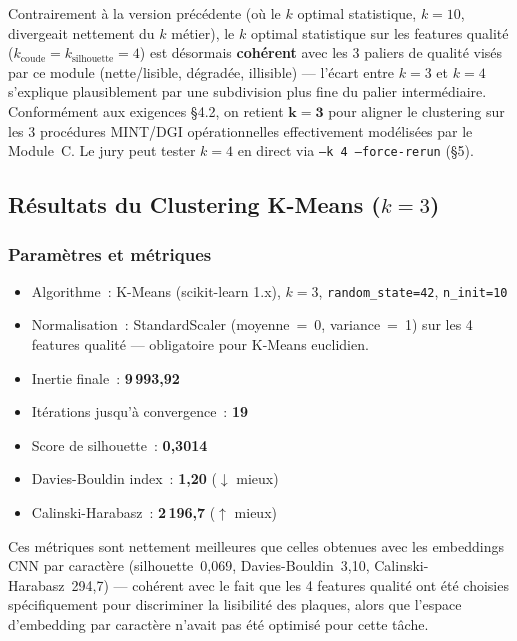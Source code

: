 Contrairement à la version précédente (où le $k$ optimal statistique,
$k=10$, divergeait nettement du $k$ métier), le $k$ optimal statistique
sur les features qualité ($k_{\text{coude}}=k_{\text{silhouette}}=4$)
est désormais \textbf{cohérent} avec les 3 paliers de qualité visés par
ce module (nette/lisible, dégradée, illisible) — l'écart entre $k=3$ et
$k=4$ s'explique plausiblement par une subdivision plus fine du palier
intermédiaire. Conformément aux exigences §4.2, on retient
$\mathbf{k=3}$ pour aligner le clustering sur les 3 procédures MINT/DGI
opérationnelles effectivement modélisées par le Module~C. Le jury peut
tester $k=4$ en direct via \texttt{--k 4 --force-rerun} (§5).

\subsection{Résultats du Clustering K-Means ($k=3$)}
\label{sec:b:resultats}

\subsubsection{Paramètres et métriques}

\begin{itemize}
  \item Algorithme~: K-Means (scikit-learn 1.x), $k=3$,
    \texttt{random\_state=42}, \texttt{n\_init=10}
  \item Normalisation~: StandardScaler (moyenne~=~0, variance~=~1) sur
    les 4 features qualité — obligatoire pour K-Means euclidien.
  \item Inertie finale~: \textbf{9\,993{,}92}
  \item Itérations jusqu'à convergence~: \textbf{19}
  \item Score de silhouette~: \textbf{0{,}3014}
  \item Davies-Bouldin index~: \textbf{1{,}20} ($\downarrow$ mieux)
  \item Calinski-Harabasz~: \textbf{2\,196{,}7} ($\uparrow$ mieux)
\end{itemize}

Ces métriques sont nettement meilleures que celles obtenues avec les
embeddings CNN par caractère (silhouette~0{,}069, Davies-Bouldin~3{,}10,
Calinski-Harabasz~294{,}7) — cohérent avec le fait que les 4 features
qualité ont été choisies spécifiquement pour discriminer la lisibilité
des plaques, alors que l'espace d'embedding par caractère n'avait pas
été optimisé pour cette tâche.

